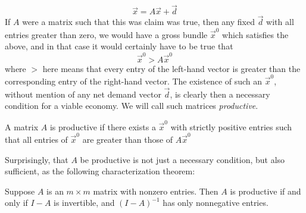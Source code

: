 \[ \vec{x} = A\vec{x} + \vec{d} \]
If $A$ were a matrix such that this was claim was true, then any fixed $\vec{d}$ with all entries greater than zero, we would have a gross bundle $\vec{x}^0$ which satisfies the above, and in that case it would certainly have to be true that 
\[ \vec{x}^0 > A\vec{x}^0 \]
where $>$ here means that every entry of the left-hand vector is greater than the corresponding entry of the right-hand vector. The existence of such an $\vec{x}^0$, without mention of any net demand vector $\vec{d}$, is clearly then a necessary condition for a viable economy. We will call such matrices \textit{productive}.
\begin{definition}
	A matrix $A$ is productive if there exists a $\vec{x}^0$ with strictly positive entries such that all entries of $\vec{x}^0$ are greater than those of $A\vec{x}^0$ 
\end{definition}
Surprisingly, that $A$ be productive is not just a necessary condition, but also sufficient, as the following characterization theorem:
\begin{theorem}
	Suppose $A$ is an $m\times m$ matrix with nonzero entries. Then $A$ is productive if and only if $I-A$ is invertible, and $(I-A)^{-1}$ has only nonnegative entries.
\end{theorem}
